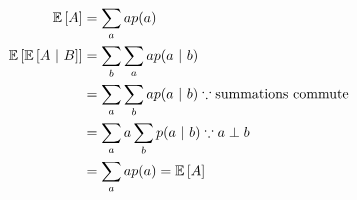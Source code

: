 \tftrue
\begin{align*}
    \mathbb{E}\left[A\right] &= \sum_a a p(a)\\
    \mathbb{E}\left[\mathbb{E}\left[A ~\vert~ B\right]\right] &= \sum_b \sum_a a p(a ~\vert~ b)\\
        &= \sum_a \sum_b a p(a ~\vert~ b) \because \text{summations commute}\\
        &= \sum_a a \sum_b p(a ~\vert~ b) \because a \perp b\\
        &= \sum_a a p(a) = \mathbb{E}\left[A\right]
\end{align*}
